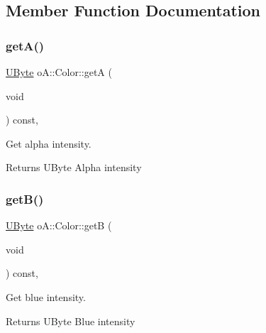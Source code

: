 \subsection{Member Function Documentation}
\mbox{\label{classo_a_1_1_color_a27cd67a64f4cc15f09fb7686890add8f}} 
\subsubsection{\texorpdfstring{get\+A()}{getA()}}
{\footnotesize\ttfamily \mbox{\hyperlink{namespaceo_a_a8c38e43a304d568b8495770dd8d50513}{U\+Byte}} o\+A\+::\+Color\+::getA (\begin{DoxyParamCaption}\item[{void}]{ }\end{DoxyParamCaption}) const\hspace{0.3cm}{\ttfamily [inline]}, {\ttfamily [noexcept]}}



Get alpha intensity. 

\begin{DoxyReturn}{Returns}
U\+Byte Alpha intensity 
\end{DoxyReturn}
\mbox{\label{classo_a_1_1_color_a8a30e79da1de484a4ff47ed2bcbc8e23}} 
\subsubsection{\texorpdfstring{get\+B()}{getB()}}
{\footnotesize\ttfamily \mbox{\hyperlink{namespaceo_a_a8c38e43a304d568b8495770dd8d50513}{U\+Byte}} o\+A\+::\+Color\+::getB (\begin{DoxyParamCaption}\item[{void}]{ }\end{DoxyParamCaption}) const\hspace{0.3cm}{\ttfamily [inline]}, {\ttfamily [noexcept]}}



Get blue intensity. 

\begin{DoxyReturn}{Returns}
U\+Byte Blue intensity 
\end{DoxyReturn}
\mbox{\label{classo_a_1_1_color_a3dcd5785db4a2c1a5a49a70d5378154a}} 
